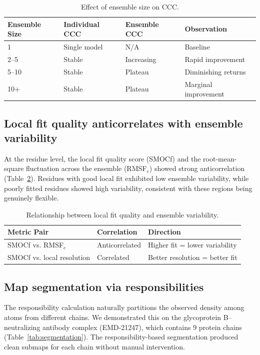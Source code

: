 \documentclass[11pt,a4paper]{article}
\begin{document}
\begin{table}[htbp]
\centering
\caption{Effect of ensemble size on CCC.}
\label{tab:ensemble_size}
\begin{tabular}{llll}
\toprule
\textbf{Ensemble Size} & \textbf{Individual CCC} & \textbf{Ensemble CCC} & \textbf{Observation} \\
\midrule
1 & Single model & N/A & Baseline \\
2--5 & Stable & Increasing & Rapid improvement \\
5--10 & Stable & Plateau & Diminishing returns \\
10+ & Stable & Plateau & Marginal improvement \\
\bottomrule
\end{tabular}
\end{table}

\subsection{Local fit quality anticorrelates with ensemble variability}

At the residue level, the local fit quality score (SMOCf) and the root-mean-square fluctuation across the ensemble (RMSF$_e$) showed strong anticorrelation (Table~\ref{tab:local_fit}). Residues with good local fit exhibited low ensemble variability, while poorly fitted residues showed high variability, consistent with these regions being genuinely flexible.

\begin{table}[htbp]
\centering
\caption{Relationship between local fit quality and ensemble variability.}
\label{tab:local_fit}
\begin{tabular}{lll}
\toprule
\textbf{Metric Pair} & \textbf{Correlation} & \textbf{Direction} \\
\midrule
SMOCf vs. RMSF$_e$ & Anticorrelated & Higher fit = lower variability \\
SMOCf vs. local resolution & Correlated & Better resolution = better fit \\
\bottomrule
\end{tabular}
\end{table}

\subsection{Map segmentation via responsibilities}

The responsibility calculation naturally partitions the observed density among atoms from different chains. We demonstrated this on the glycoprotein B--neutralizing antibody complex (EMD-21247), which contains 9 protein chains (Table~\ref{tab:segmentation}). The responsibility-based segmentation produced clean submaps for each chain without manual intervention.
\end{document}
